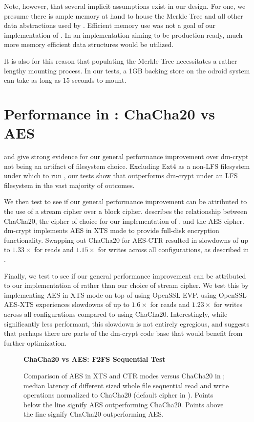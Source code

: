 Note, however, that several implicit assumptions exist in our design. For one,
we presume there is ample memory at hand to house the Merkle Tree and all other
data abstractions used by \SYSTEM{}. Efficient memory use was not a goal of our
implementation of \SYSTEM{}. In an implementation aiming to be production ready,
much more memory efficient data structures would be utilized.

It is also for this reason that populating the Merkle Tree necessitates a rather
lengthy mounting process. In our tests, a 1GB backing store on the odroid system
can take as long as 15 seconds to mount.

\section{Performance in \SYSTEM{}: ChaCha20 vs AES}

 and  give strong evidence for
our general performance improvement over dm-crypt not being an artifact of
filesystem choice. Excluding Ext4 as a non-LFS filesystem under which to run
\SYSTEM{}, our tests show that \SYSTEM{} outperforms dm-crypt under an LFS
filesystem in the vast majority of outcomes.

We then test to see if our general performance improvement can be attributed
to the use of a stream cipher over a block cipher.
 describes the relationship between ChaCha20,
the cipher of choice for our implementation of \SYSTEM{}, and the AES cipher.
dm-crypt implements AES in XTS mode to provide full-disk encryption
functionality. Swapping out ChaCha20 for AES-CTR resulted in slowdowns of up to
$1.33\times$ for reads and $1.15\times$ for writes across all configurations, as
described in .

Finally, we test to see if our general performance improvement can be attributed to
our implementation of \SYSTEM{} rather than our choice of stream cipher. We test
this by implementing AES in XTS mode on top of \SYSTEM{} using OpenSSL EVP.
\SYSTEM{} using OpenSSL AES-XTS experiences slowdowns of up to $1.6\times$ for
reads and $1.23\times$ for writes across all configurations compared to
\SYSTEM{} using ChaCha20. Interestingly, while significantly less performant,
this slowdown is not entirely egregious, and suggests that perhaps there are
parts of the dm-crypt code base that would benefit from further optimization.

\begin{figure}[ht]
    \textbf{ChaCha20 vs AES: \SYSTEM{} F2FS Sequential Test}\par\medskip
    \centering
    {}
    \caption{Comparison of AES in XTS and CTR modes versus ChaCha20 in
      \SYSTEM{}; median latency of different sized whole file
      sequential read and write operations normalized to ChaCha20
      (default cipher in \SYSTEM{}). Points below the line signify AES
      outperforming ChaCha20. Points above the line signify ChaCha20
      outperforming AES.}
    \label{fig:microbench-aes-vs-chacha}
\end{figure}

